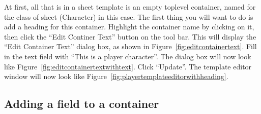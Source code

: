 At first, all that is in a sheet template is an empty toplevel
container, named for the class of sheet (Character) in this case.  The
first thing you will want to do is add a heading for this container.
Highlight the container name by clicking on it, then click the ``Edit
Continer Text'' button on the tool bar.  This will display the ``Edit
Container Text'' dialog box, as shown in
Figure~\ref{fig:editcontainertext}. Fill in the text field with ``This
is a player character''.  The dialog box will now look like
Figure~\ref{fig:editcontainertextwithtext}. Click ``Update''. The
template editor window will now look like
Figure~\ref{fig:playertemplateeditorwithheading}.

\subsection{Adding a field to a container}

